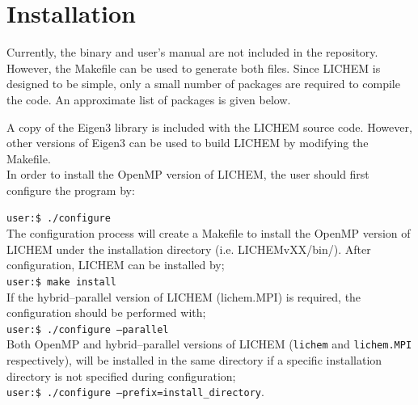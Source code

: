 \documentclass[12pt]{report}
\begin{document}
\section{Installation}

Currently, the binary and user's manual are not included in the repository.
However, the Makefile can be used to generate both files.
Since LICHEM is designed to be simple, only a small number of packages are
required to compile the code.
An approximate list of packages is given below.
\begin{quote}
\end{quote}

A copy of the Eigen3 library is included with the LICHEM source code.
However, other versions of Eigen3 can be used to build LICHEM by modifying
the Makefile. \\

In order to install the OpenMP version of LICHEM, the user should first
configure the program by:

\texttt{user:\$ ./configure}\\

The configuration process will create a
Makefile to install the OpenMP version of
LICHEM under the installation directory
(i.e. LICHEMvXX/bin/).
After configuration, LICHEM can be installed
by;\\

\texttt{user:\$ make install} \\

If the hybrid--parallel version of LICHEM (lichem.MPI) is required,
the configuration should be performed with; \\

\texttt{user:\$ ./configure --parallel} \\

Both OpenMP and hybrid--parallel versions of LICHEM
(\texttt{lichem} and \texttt{lichem.MPI} respectively), will be installed in
the same directory if a specific installation directory is not
specified during configuration; \\

\texttt{user:\$ ./configure --prefix=install_directory}.\\


\end{document}
